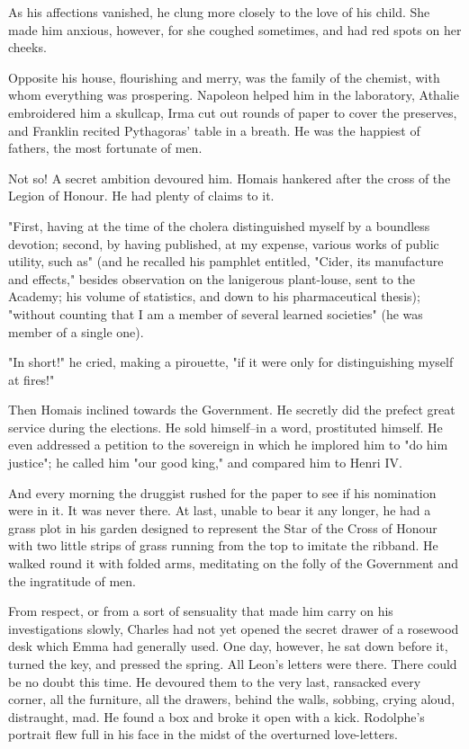 \documentclass[11pt,twocolumn]{ltugboat}
\begin{document}
As his affections vanished, he clung more closely to the love of his
child. She made him anxious, however, for she coughed sometimes, and had
red spots on her cheeks.

Opposite his house, flourishing and merry, was the family of the
chemist, with whom everything was prospering. Napoleon helped him in the
laboratory, Athalie embroidered him a skullcap, Irma cut out rounds of
paper to cover the preserves, and Franklin recited Pythagoras' table in
a breath. He was the happiest of fathers, the most fortunate of men.

Not so! A secret ambition devoured him. Homais hankered after the cross
of the Legion of Honour. He had plenty of claims to it.

"First, having at the time of the cholera distinguished myself by a
boundless devotion; second, by having published, at my expense,
various works of public utility, such as" (and he recalled his pamphlet
entitled, "Cider, its manufacture and effects," besides observation
on the lanigerous plant-louse, sent to the Academy; his volume of
statistics, and down to his pharmaceutical thesis); "without counting
that I am a member of several learned societies" (he was member of a
single one).

"In short!" he cried, making a pirouette, "if it were only for
distinguishing myself at fires!"

Then Homais inclined towards the Government. He secretly did the
prefect great service during the elections. He sold himself--in a word,
prostituted himself. He even addressed a petition to the sovereign
in which he implored him to "do him justice"; he called him "our good
king," and compared him to Henri IV.

And every morning the druggist rushed for the paper to see if his
nomination were in it. It was never there. At last, unable to bear it
any longer, he had a grass plot in his garden designed to represent the
Star of the Cross of Honour with two little strips of grass running from
the top to imitate the ribband. He walked round it with folded arms,
meditating on the folly of the Government and the ingratitude of men.

From respect, or from a sort of sensuality that made him carry on his
investigations slowly, Charles had not yet opened the secret drawer of
a rosewood desk which Emma had generally used. One day, however, he
sat down before it, turned the key, and pressed the spring. All Leon's
letters were there. There could be no doubt this time. He devoured them
to the very last, ransacked every corner, all the furniture, all the
drawers, behind the walls, sobbing, crying aloud, distraught, mad. He
found a box and broke it open with a kick. Rodolphe's portrait flew full
in his face in the midst of the overturned love-letters.
\end{document}
